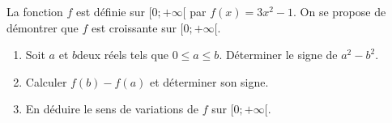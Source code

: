 
La fonction $f$ est définie sur $[0;+\infty[$ par $f(x)=3x^2-1$. On se propose de démontrer que $f$ est croissante sur $[0;+\infty[$.
\begin{enumerate}
\item Soit $a$ et $b$deux réels tels que $0 \leq a \leq b$. Déterminer le signe de $a^2 - b^2$.
\item Calculer $f(b)-f(a)$ et déterminer son signe.
\item En déduire le sens de variations de $f$ sur $[0;+\infty[$.
\end{enumerate}
